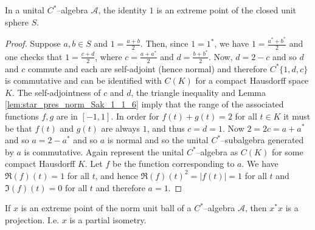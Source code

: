 \begin{lemma}
  \label{lem:one_is_extreme}
  \leanok
  In a unital $C^{*}$--algebra $\mathcal{A}$, the identity $1$ is an extreme point of the closed unit sphere $S$.
\end{lemma}

\begin{proof}
  \leanok
  Suppose $a,b\in S$ and $1=\frac{a+b}{2}$. Then, since $1=1^{*}$, we have $1=\frac{a^{*}+b^{*}}{2}$ and one checks that $1=\frac{c+d}{2}$,
  where $c=\frac{a+a^{*}}{2}$ and $d=\frac{b+b^{*}}{2}$. Now, $d=2-c$ and so $d$ and $c$ commute and each are self-adjoint (hence normal)
  and therefore $C^{*}\{1,d,c\}$ is commutative and can be identified with $C(K)$ for a compact Hausdorff space $K$.
  The self-adjointness of $c$ and $d$, the triangle inequality and Lemma \ref{lem:star_pres_norm_Sak_1_1_6} imply
  that the range of the associated functions $f,g$ are in $[-1,1]$. In order for $f(t)+g(t)=2$ for all $t\in K$
  it must be that $f(t)$ and $g(t)$ are always $1$, and thus $c=d=1$. Now $2=2c=a+a^{*}$ and so $a=2-a^{*}$ and so $a$ is normal and
  so the unital $C^{*}$--subalgebra generated by $a$ is commutative.
  Again represent the unital $C^{*}$--algebra as $C(K)$ for some compact Hausdorff $K$. Let $f$ be the
  function corresponding to $a$. We have $\Re(f)(t)=1$ for all $t$, and hence $\Re(f)(t)^2=|f(t)|=1$ for all $t$ and $\Im(f)(t)=0$ for
  all $t$ and therefore $a=1$.
\end{proof}



\begin{lemma}
  \label{lem:extreme_partial_isom}
  \leanok
  If $x$ is an extreme point of the norm unit ball of a $C^{*}$--algebra $\mathcal{A}$, then $x^{*}x$ is a projection. I.e. $x$ is a partial
  isometry.
\end{lemma}

